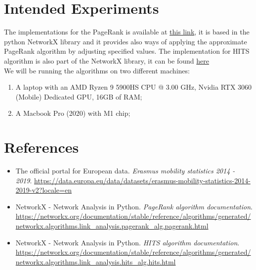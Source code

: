 \section{Intended Experiments}
    The implementations for the PageRank is available at \href{https://networkx.org/documentation/stable/reference/algorithms/generated/networkx.algorithms.link_analysis.pagerank_alg.pagerank.html}{\color{blue}this link}, 
    it is based in the python NetworkX library and it provides also ways of applying the approximate PageRank algorithm by adjusting specified values. 
    The implementation for HITS algorithm is also part of the NetworkX library, it can be found \href{https://networkx.org/documentation/stable/reference/algorithms/generated/networkx.algorithms.link_analysis.hits_alg.hits.html}{\color{blue}here}
    \\
    We will be running the algorithms on two different machines:
    \begin{enumerate}
        \item A laptop with an AMD Ryzen 9 5900HS CPU @ 3.00 GHz, Nvidia RTX 3060 (Mobile) Dedicated GPU, 16GB of RAM;
        \item A Macbook Pro (2020) with M1 chip;
    \end{enumerate}
\newpage
\section{References}
    \begin{itemize}
        \item The official portal for European data. \textit{Erasmus mobility statistics 2014 - 2019}. \url{https://data.europa.eu/data/datasets/erasmus-mobility-statistics-2014-2019-v2?locale=en} 
        \item NetworkX - Network Analysis in Python. \textit{PageRank algorithm documentation}. \url{https://networkx.org/documentation/stable/reference/algorithms/generated/networkx.algorithms.link_analysis.pagerank_alg.pagerank.html}
        \item NetworkX - Network Analysis in Python. \textit{HITS algorithm documentation}. \url{https://networkx.org/documentation/stable/reference/algorithms/generated/networkx.algorithms.link_analysis.hits_alg.hits.html}
    \end{itemize}
